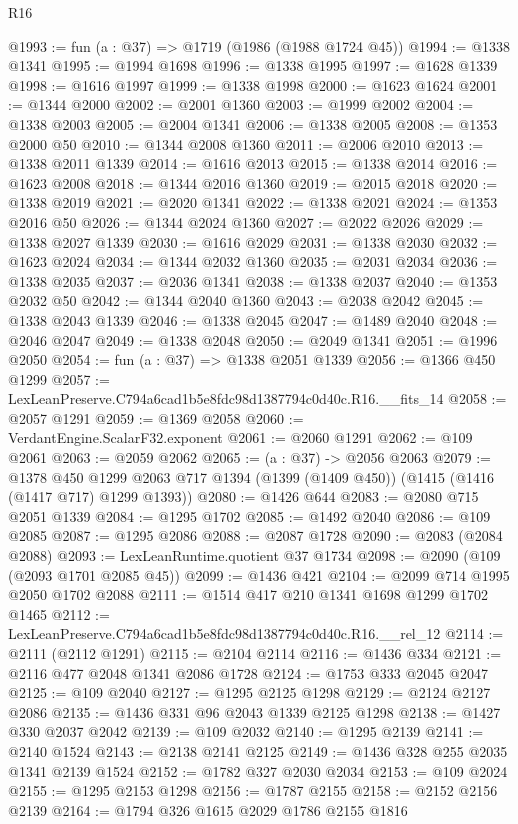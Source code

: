 \begin{lexlean}{R16}
\begin{coremodule}
@1993 := fun (a : @37) => @1719 (@1986 (@1988 @1724 @45))
@1994 := @1338 @1341
@1995 := @1994 @1698
@1996 := @1338 @1995
@1997 := @1628 @1339
@1998 := @1616 @1997
@1999 := @1338 @1998
@2000 := @1623 @1624
@2001 := @1344 @2000
@2002 := @2001 @1360
@2003 := @1999 @2002
@2004 := @1338 @2003
@2005 := @2004 @1341
@2006 := @1338 @2005
@2008 := @1353 @2000 @50
@2010 := @1344 @2008 @1360
@2011 := @2006 @2010
@2013 := @1338 @2011 @1339
@2014 := @1616 @2013
@2015 := @1338 @2014
@2016 := @1623 @2008
@2018 := @1344 @2016 @1360
@2019 := @2015 @2018
@2020 := @1338 @2019
@2021 := @2020 @1341
@2022 := @1338 @2021
@2024 := @1353 @2016 @50
@2026 := @1344 @2024 @1360
@2027 := @2022 @2026
@2029 := @1338 @2027 @1339
@2030 := @1616 @2029
@2031 := @1338 @2030
@2032 := @1623 @2024
@2034 := @1344 @2032 @1360
@2035 := @2031 @2034
@2036 := @1338 @2035
@2037 := @2036 @1341
@2038 := @1338 @2037
@2040 := @1353 @2032 @50
@2042 := @1344 @2040 @1360
@2043 := @2038 @2042
@2045 := @1338 @2043 @1339
@2046 := @1338 @2045
@2047 := @1489 @2040
@2048 := @2046 @2047
@2049 := @1338 @2048
@2050 := @2049 @1341
@2051 := @1996 @2050
@2054 := fun (a : @37) => @1338 @2051 @1339
@2056 := @1366 @450 @1299
@2057 := LexLeanPreserve.C794a6cad1b5e8fdc98d1387794c0d40c.R16.__fits_14
@2058 := @2057 @1291
@2059 := @1369 @2058
@2060 := VerdantEngine.ScalarF32.exponent
@2061 := @2060 @1291
@2062 := @109 @2061
@2063 := @2059 @2062
@2065 := (a : @37) -> @2056 @2063
@2079 := @1378
    @450
    @1299
    @2063
    @717
    @1394
    (@1399 (@1409 @450))
    (@1415 (@1416 (@1417 @717) @1299 @1393))
@2080 := @1426 @644
@2083 := @2080 @715 @2051 @1339
@2084 := @1295 @1702
@2085 := @1492 @2040
@2086 := @109 @2085
@2087 := @1295 @2086
@2088 := @2087 @1728
@2090 := @2083 (@2084 @2088)
@2093 := LexLeanRuntime.quotient @37 @1734
@2098 := @2090 (@109 (@2093 @1701 @2085 @45))
@2099 := @1436 @421
@2104 := @2099 @714 @1995 @2050 @1702 @2088
@2111 := @1514 @417 @210 @1341 @1698 @1299 @1702 @1465
@2112 := LexLeanPreserve.C794a6cad1b5e8fdc98d1387794c0d40c.R16.__rel_12
@2114 := @2111 (@2112 @1291)
@2115 := @2104 @2114
@2116 := @1436 @334
@2121 := @2116 @477 @2048 @1341 @2086 @1728
@2124 := @1753 @333 @2045 @2047
@2125 := @109 @2040
@2127 := @1295 @2125 @1298
@2129 := @2124 @2127 @2086
@2135 := @1436 @331 @96 @2043 @1339 @2125 @1298
@2138 := @1427 @330 @2037 @2042
@2139 := @109 @2032
@2140 := @1295 @2139
@2141 := @2140 @1524
@2143 := @2138 @2141 @2125
@2149 := @1436 @328 @255 @2035 @1341 @2139 @1524
@2152 := @1782 @327 @2030 @2034
@2153 := @109 @2024
@2155 := @1295 @2153 @1298
@2156 := @1787 @2155
@2158 := @2152 @2156 @2139
@2164 := @1794 @326 @1615 @2029 @1786 @2155 @1816

\end{coremodule}
\end{lexlean}
